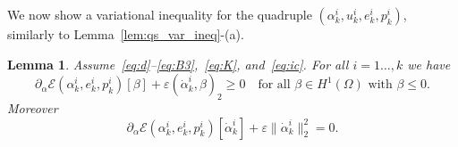 \documentclass[reqno]{amsart}
\newtheorem{lemma}[corollary]{Lemma}
\theoremstyle{definition}
\numberwithin{equation}{section}
\begin{document}
We now show a variational inequality for the quadruple $(\alpha_k^i,u_k^i,e_k^i,p_k^i)$, similarly to Lemma~\ref{lem:qs_var_ineq}-(a).

\begin{lemma}
Assume~\eqref{eq:d}--\eqref{eq:B3},~\eqref{eq:K}, and~\eqref{eq:ic}. For all $i=1\dots,k$ we have
\begin{equation}\label{eq:st_aki}
\partial_\alpha \mathcal E(\alpha_k^i,e_k^i,p_k^i)[\beta]+\varepsilon(\dot\alpha_k^i,\beta)_2\ge 0\quad\text{for all $\beta\in H^1(\Omega)$ with $\beta\le 0$}.
\end{equation}
Moreover
\begin{equation}\label{eq:st_daki}
\partial_\alpha \mathcal E(\alpha_k^i,e_k^i,p_k^i)[\dot\alpha_k^i]+\varepsilon\|\dot\alpha_k^i\|_2^2=0.
\end{equation}
\end{lemma}
\end{document}
